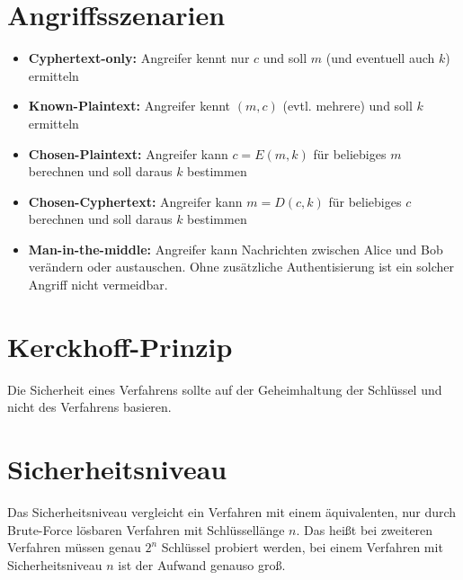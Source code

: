 \section{Angriffsszenarien}
\begin{itemize}
    \item
        \textbf{Cyphertext-only:} Angreifer kennt nur $c$ und soll $m$ (und eventuell auch $k$) ermitteln
    \item 
        \textbf{Known-Plaintext:} Angreifer kennt $(m, c)$ (evtl. mehrere) und soll $k$ ermitteln
    \item
        \textbf{Chosen-Plaintext:} Angreifer kann $c=E(m, k)$ für beliebiges $m$ berechnen und soll daraus $k$ bestimmen
    \item
        \textbf{Chosen-Cyphertext:} Angreifer kann $m=D(c,k)$ für beliebiges $c$ berechnen und soll daraus $k$ bestimmen
    \item
        \textbf{Man-in-the-middle:} Angreifer kann Nachrichten zwischen Alice und Bob verändern oder austauschen.
        Ohne zusätzliche Authentisierung ist ein solcher Angriff nicht vermeidbar.
\end{itemize}

\section{Kerckhoff-Prinzip}
Die Sicherheit eines Verfahrens sollte auf der Geheimhaltung der Schlüssel und nicht des
Verfahrens basieren.

\section{Sicherheitsniveau}
Das Sicherheitsniveau vergleicht ein Verfahren mit einem äquivalenten, nur durch Brute-Force lösbaren Verfahren mit Schlüssellänge $n$. Das heißt bei zweiteren Verfahren müssen
genau $2^n$ Schlüssel probiert werden, bei einem Verfahren mit Sicherheitsniveau $n$ ist
der Aufwand genauso groß.
